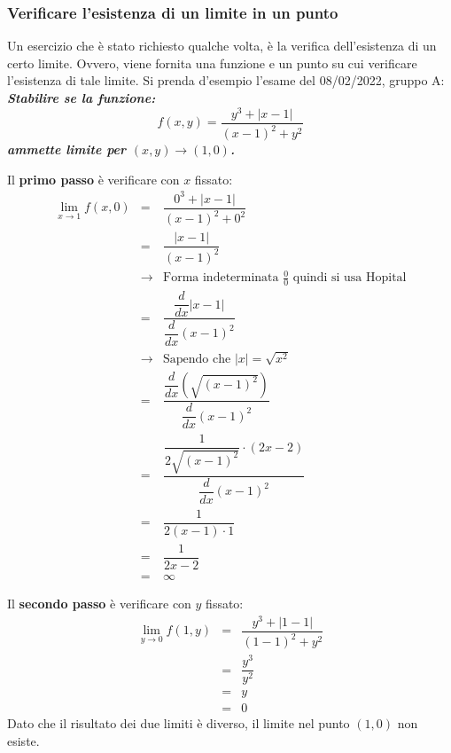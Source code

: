 \documentclass[a4paper]{article}
\begin{document}
	\subsubsection{Verificare l'esistenza di un limite in un punto}

	Un esercizio che è stato richiesto qualche volta, è la verifica dell'esistenza di un certo limite. Ovvero, viene fornita una funzione e un punto su cui verificare l'esistenza di tale limite. Si prenda d'esempio l'esame del 08/02/2022, gruppo A: \textcolor{Green4}{\textbf{\emph{Stabilire se la funzione:}}
	\begin{equation*}
		f\left(x,y\right) = \dfrac{y^{3} + |x-1|}{\left(x-1\right)^{2} + y^{2}}
	\end{equation*}
	\textbf{\emph{ammette limite per $\left(x,y\right) \rightarrow \left(1,0\right)$.}}}\newline

	\noindent
	Il \textbf{primo passo} è verificare con $x$ fissato:
	\begin{equation*}
		\begin{array}{rcl}
			\displaystyle\lim_{x \rightarrow 1} f\left(x, 0\right) &=& \dfrac{0^{3} + |x-1|}{\left(x-1\right)^{2} + 0^{2}} \\ [1.5em]
			&=& \dfrac{|x-1|}{\left(x-1\right)^{2}} \\ [1.5em]
			&\rightarrow& \text{Forma indeterminata } \frac{0}{0} \text{ quindi si usa Hopital} \\ [1em]
			&=& \dfrac{ \dfrac{d}{dx} |x-1|}{ \dfrac{d}{dx} \left(x-1\right)^{2}} \\ [2.5em]
			&\rightarrow& \text{Sapendo che } |x| = \sqrt{x^{2}} \\ [1em]
			&=& \dfrac{ \dfrac{d}{dx} \left(\sqrt{\left(x-1\right)^{2}}\right)}{ \dfrac{d}{dx} \left(x-1\right)^{2}} \\ [2.5em]
			&=& \dfrac{\dfrac{1}{2\sqrt{\left(x-1\right)^{2}}} \cdot \left(2x-2\right)}{ \dfrac{d}{dx} \left(x-1\right)^{2}} \\ [2.5em]
			&=& \dfrac{1}{2\left(x-1\right) \cdot 1} \\ [1.5em]
			&=& \dfrac{1}{2x - 2} \\ [1em]
			&=& \infty
		\end{array}
	\end{equation*}\newpage

	\noindent
	Il \textbf{secondo passo} è verificare con $y$ fissato:
	\begin{equation*}
		\begin{array}{rcl}
			\displaystyle\lim_{y \rightarrow 0} f\left(1, y\right) &=& \dfrac{y^{3} + |1-1|}{\left(1-1\right)^{2} + y^{2}} \\ [1.5em]
			&=& \dfrac{y^{3}}{y^{2}} \\ [1.5em]
			&=& y \\
			&=& 0
		\end{array}
	\end{equation*}
	Dato che il risultato dei due limiti è diverso, il limite nel punto $\left(1,0\right)$ non esiste.\newpage
\end{document}
